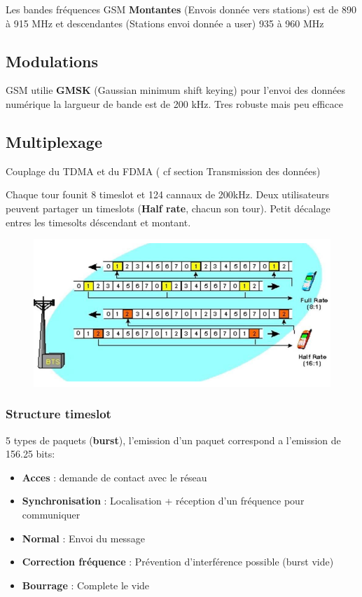 \documentclass[12pt]{article}
\begin{document}
			Les bandes fréquences GSM \textbf{Montantes} (Envois donnée vers stations) est de 890 à 915 MHz et descendantes (Stations envoi donnée a user) 935 à 960 MHz
			
	\subsection{Modulations}
		GSM utilie \textbf{GMSK} (Gaussian minimum shift keying) pour l'envoi des données numérique la largueur de bande est de 200 kHz. Tres robuste mais peu efficace
		
	\subsection{Multiplexage}
 		Couplage du TDMA et du FDMA ( cf section Transmission des données)
 		
 		Chaque tour founit 8 timeslot et 124 cannaux de 200kHz. Deux utilisateurs peuvent partager un timeslots (\textbf{Half rate}, chacun son tour). Petit décalage entres les timesolts déscendant et montant.
 		
 		\begin{figure}[H]
 			\centering
 			\includegraphics[width=\textwidth]{img/CM/HR.png}
 		\end{figure}
 		
 		\subsubsection{Structure timeslot}
 			5 types de paquets (\textbf{burst}), l'emission d'un paquet  correspond a l'emission de 156.25 bits:
 			
 			\begin{itemize}
 				\item \textbf{Acces} : demande de contact avec le réseau
 				\item \textbf{Synchronisation} : Localisation + réception d'un fréquence pour communiquer
 				\item \textbf{Normal} : Envoi du message
 				\item \textbf{Correction fréquence} : Prévention d'interférence possible (burst vide)
 				\item \textbf{Bourrage} : Complete le vide
 			\end{itemize}
 			
\end{document}
